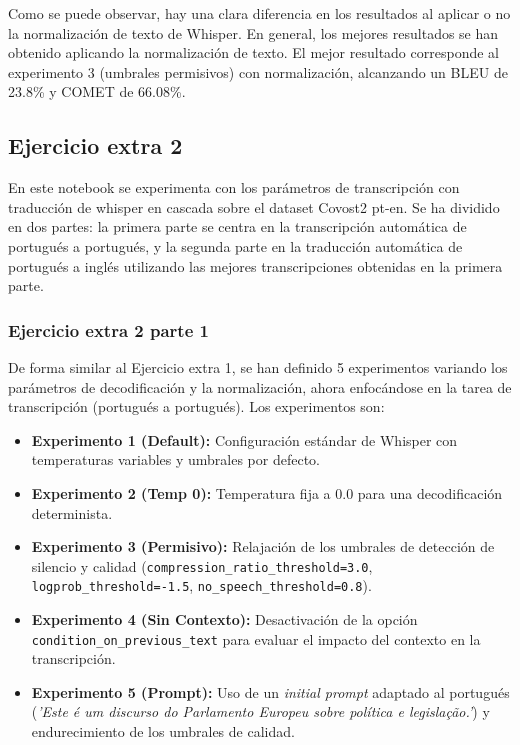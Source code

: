 \documentclass[11pt,spanish,listoffigures,listoftables]{tfgetsinf}
\begin{document}
Como se puede observar, hay una clara diferencia en los resultados al aplicar o no la normalización de texto de Whisper. En general, los mejores resultados se han obtenido aplicando la normalización de texto. El mejor resultado corresponde al experimento 3 (umbrales permisivos) con normalización, alcanzando un BLEU de 23.8\% y COMET de 66.08\%.

\subsection{Ejercicio extra 2}
En este notebook se experimenta con los parámetros de transcripción con traducción de whisper en cascada sobre el dataset Covost2 pt-en. Se ha dividido en dos partes: la primera parte se centra en la transcripción automática de portugués a portugués, y la segunda parte en la traducción automática de portugués a inglés utilizando las mejores transcripciones obtenidas en la primera parte.

\subsubsection{Ejercicio extra 2 parte 1}
De forma similar al Ejercicio extra 1, se han definido 5 experimentos variando los parámetros de decodificación y la normalización, ahora enfocándose en la tarea de transcripción (portugués a portugués). Los experimentos son:

\begin{itemize}
  \item \textbf{Experimento 1 (Default):} Configuración estándar de Whisper con temperaturas variables y umbrales por defecto.
  \item \textbf{Experimento 2 (Temp 0):} Temperatura fija a 0.0 para una decodificación determinista.
  \item \textbf{Experimento 3 (Permisivo):} Relajación de los umbrales de detección de silencio y calidad (\texttt{compression\_ratio\_threshold=3.0}, \texttt{logprob\_threshold=-1.5}, \texttt{no\_speech\_threshold=0.8}).
  \item \textbf{Experimento 4 (Sin Contexto):} Desactivación de la opción \texttt{condition\_on\_previous\_text} para evaluar el impacto del contexto en la transcripción.
  \item \textbf{Experimento 5 (Prompt):} Uso de un \textit{initial prompt} adaptado al portugués (\textit{'Este é um discurso do Parlamento Europeu sobre política e legislação.'}) y endurecimiento de los umbrales de calidad.
\end{itemize}
\end{document}
